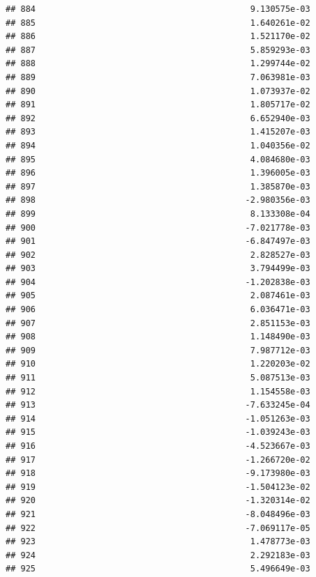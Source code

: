 \documentclass[
]{article}
\begin{document}
\begin{verbatim}
## 884                                           9.130575e-03
## 885                                           1.640261e-02
## 886                                           1.521170e-02
## 887                                           5.859293e-03
## 888                                           1.299744e-02
## 889                                           7.063981e-03
## 890                                           1.073937e-02
## 891                                           1.805717e-02
## 892                                           6.652940e-03
## 893                                           1.415207e-03
## 894                                           1.040356e-02
## 895                                           4.084680e-03
## 896                                           1.396005e-03
## 897                                           1.385870e-03
## 898                                          -2.980356e-03
## 899                                           8.133308e-04
## 900                                          -7.021778e-03
## 901                                          -6.847497e-03
## 902                                           2.828527e-03
## 903                                           3.794499e-03
## 904                                          -1.202838e-03
## 905                                           2.087461e-03
## 906                                           6.036471e-03
## 907                                           2.851153e-03
## 908                                           1.148490e-03
## 909                                           7.987712e-03
## 910                                           1.220203e-02
## 911                                           5.087513e-03
## 912                                           1.154558e-03
## 913                                          -7.633245e-04
## 914                                          -1.051263e-03
## 915                                          -1.039243e-03
## 916                                          -4.523667e-03
## 917                                          -1.266720e-02
## 918                                          -9.173980e-03
## 919                                          -1.504123e-02
## 920                                          -1.320314e-02
## 921                                          -8.048496e-03
## 922                                          -7.069117e-05
## 923                                           1.478773e-03
## 924                                           2.292183e-03
## 925                                           5.496649e-03

\end{verbatim}
\end{document}
